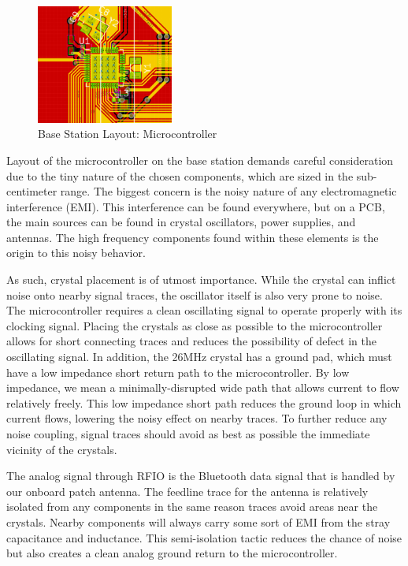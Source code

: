 \documentclass[journal,compsoc]{IEEEtran}
\begin{document}
\begin{figure}[ht] 	%
\centering
\includegraphics[width=0.4\textwidth]{base-layout-uc.PNG}
\caption{ \space Base Station Layout: Microcontroller}
\label{base-lay-uc}
\end{figure}

Layout of the microcontroller on the base station demands careful consideration due to the tiny nature of the chosen components, which are sized in the sub-centimeter range. The biggest concern is the noisy nature of any electromagnetic interference (EMI). This interference can be found everywhere, but on a PCB, the main sources can be found in crystal oscillators, power supplies, and antennas. The high frequency components found within these elements is the origin to this noisy behavior.

As such, crystal placement is of utmost importance. While the crystal can inflict noise onto nearby signal traces, the oscillator itself is also very prone to noise. The microcontroller requires a clean oscillating signal to operate properly with its clocking signal. Placing the crystals as close as possible to the microcontroller allows for short connecting traces and reduces the possibility of defect in the oscillating signal. In addition, the 26MHz crystal has a ground pad, which must have a low impedance short return path to the microcontroller. By low impedance, we mean a minimally-disrupted wide path that allows current to flow relatively freely. This low impedance short path reduces the ground loop in which current flows, lowering the noisy effect on nearby traces. To further reduce any noise coupling, signal traces should avoid as best as possible the immediate vicinity of the crystals.

The analog signal through RFIO is the Bluetooth data signal that is handled by our onboard patch antenna. The feedline trace for the antenna is relatively isolated from any components in the same reason traces avoid areas near the crystals. Nearby components will always carry some sort of EMI from the stray capacitance and inductance. This semi-isolation tactic reduces the chance of noise but also creates a clean analog ground return to the microcontroller.
\end{document}

